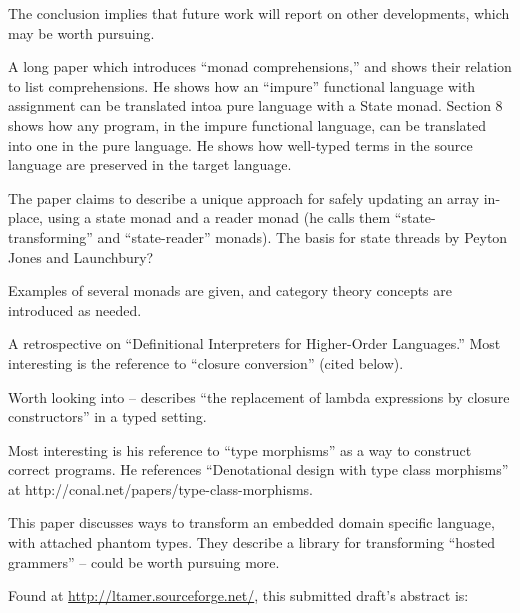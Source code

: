 \documentclass[11pt]{article}
\begin{document}
The conclusion implies that future work will report on other
developments, which may be worth pursuing.


A long paper which introduces ``monad comprehensions,'' and shows
their relation to list comprehensions. He shows how an ``impure''
functional language with assignment can be translated intoa pure
language with a State monad. Section 8 shows how any program, in the
impure functional language, can be translated into one in the pure
language. He shows how well-typed terms in the source language are
preserved in the target language.

The paper claims to describe a unique approach for safely updating an
array in-place, using a state monad and a reader monad (he calls them
``state-transforming'' and ``state-reader'' monads). The basis for
state threads by Peyton Jones and Launchbury?

Examples of several monads are given, and category theory concepts are
introduced as needed.


A retrospective on ``Definitional Interpreters for Higher-Order
Languages.'' Most interesting is the reference to ``closure
conversion'' (cited below).


Worth looking into -- describes ``the replacement of lambda
expressions by closure constructors'' in a typed setting.


Most interesting is his reference to ``type morphisms'' as a way to
construct correct programs. He references ``Denotational design with
type class morphisms'' at
http://conal.net/papers/type-class-morphisms.


This paper discusses ways to transform an embedded domain specific
language, with attached phantom types. They describe a library for
transforming ``hosted grammers'' -- could be worth pursuing more.


Found at \url{http://ltamer.sourceforge.net/}, this submitted draft's abstract is:
\end{document}
